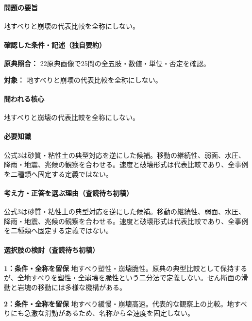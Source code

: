 \paragraph{問題の要旨} 地すべりと崩壊の代表比較を全称にしない。

\paragraph{確認した条件・記述（独自要約）}\mbox{}\par

\noindent\textbf{原典照合：} 22原典画像で25問の全五肢・数値・単位・否定を確認。\par

\noindent\textbf{対象：} 地すべりと崩壊の代表比較を全称にしない。\par

\paragraph{問われる核心} 地すべりと崩壊の代表比較を全称にしない。

\paragraph{必要知識} 公式3は砂質・粘性土の典型対応を逆にした候補。移動の継続性、弱面、水圧、降雨・地震、兆候の観察を合わせる。速度と破壊形式は代表比較であり、全事例を二種類へ固定する定義ではない。

\paragraph{考え方・正答を選ぶ理由（査読待ち初稿）} 公式3は砂質・粘性土の典型対応を逆にした候補。移動の継続性、弱面、水圧、降雨・地震、兆候の観察を合わせる。速度と破壊形式は代表比較であり、全事例を二種類へ固定する定義ではない。

\paragraph{選択肢の検討（査読待ち初稿）}\mbox{}\par

\noindent\textbf{1：条件・全称を留保} 地すべり塑性・崩壊脆性。原典の典型比較として保持するが、全地すべりを塑性・全崩壊を脆性という二分法で定義しない。せん断面の滑動と岩塊の移動には多様な機構がある。\par

\noindent\textbf{2：条件・全称を留保} 地すべり緩慢・崩壊高速。代表的な観察上の比較。地すべりにも急激な滑動があるため、名称から全速度を固定しない。\par

